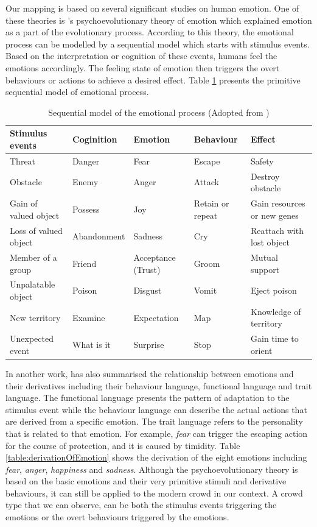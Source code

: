 Our mapping is based on several significant studies on human emotion. One of these theories is \citet{Plutchik1980}'s psychoevolutionary theory of emotion which explained emotion as a part of the evolutionary process. According to this theory, the emotional process can be modelled by a sequential model which starts with stimulus events. Based on the interpretation or cognition of these events, humans feel the emotions accordingly. The feeling state of emotion then triggers the overt behaviours or actions to achieve a desired effect. Table \ref{table:sequentialModelOfEmotion} presents the primitive sequential model of emotional process.

\begin{table}[htb!]
\caption{Sequential model of the emotional process (Adopted from \citet{plutchik2001integration})}
\label{table:sequentialModelOfEmotion}
\centering
\begin{tabular}{|p{2.5cm}|p{2.3cm}|p{2.3cm}|p{2.3cm}|p{3.5cm}|}
\hline
\textbf{Stimulus events} & \textbf{Coginition} & \textbf{Emotion} & \textbf{Behaviour} & \textbf{Effect} \\ \hline \hline
Threat & Danger & Fear & Escape & Safety \\ \hline
Obstacle & Enemy & Anger & Attack & Destroy obstacle \\ \hline
Gain of valued object & Possess & Joy & Retain or repeat & Gain resources or new genes \\ \hline
Loss of valued object & Abandonment & Sadness & Cry & Reattach with lost object \\ \hline
Member of a group & Friend & Acceptance (Trust) & Groom & Mutual support \\ \hline
Unpalatable object & Poison & Disgust & Vomit & Eject poison \\ \hline
New territory & Examine & Expectation & Map & Knowledge of territory \\ \hline
Unexpected event & What is it & Surprise & Stop & Gain time to orient \\ \hline
\end{tabular}
\end{table}

In another work, \citet{plutchik2001integration} has also summarised the relationship between emotions and their derivatives including their behaviour language, functional language and trait language. The functional language presents the pattern of adaptation to the stimulus event while the behaviour language can describe the actual actions that are derived from a specific emotion. The trait language refers to the personality that is related to that emotion. For example, \textit{fear} can trigger the escaping action for the course of protection, and it is caused by timidity. Table \ref{table:derivationOfEmotion} shows the derivation of the eight emotions including \textit{fear}, \textit{anger}, \textit{happiness} and \textit{sadness}. Although the psychoevolutionary theory is based on the basic emotions and their very primitive stimuli and derivative behaviours, it can still be applied to the modern crowd in our context. A crowd type that we can observe, can be both the stimulus events triggering the emotions or the overt behaviours triggered by the emotions. 

